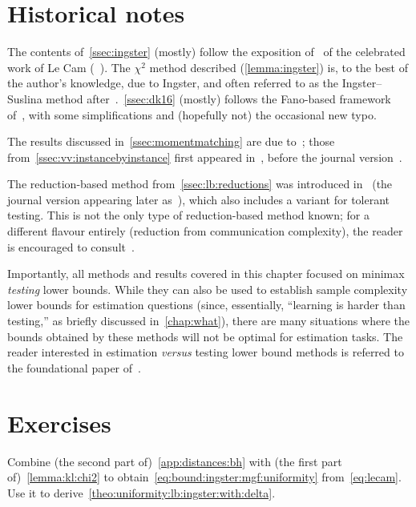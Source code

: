 \section{Historical notes}

The contents of~\cref{ssec:ingster} (mostly) follow the exposition of~\citet{Pollard:2003} of the celebrated work of Le Cam (\eg~\citet{LeCam73}). The $\chi^2$ method described (\cref{lemma:ingster}) is, to the best of the author's knowledge, due to Ingster, and often referred to as the Ingster--Suslina method after~\citep{IngsterS03}.~\cref{ssec:dk16} (mostly) follows the Fano-based framework of~\citet{DiakonikolasK16}, with some simplifications and (hopefully not) the occasional new typo.

The results discussed in~\cref{ssec:momentmatching} are due to~\citet{Valiant:11}; those from~\cref{ssec:vv:instancebyinstance} first appeared in~\citet{VV:14:FOCS}, before the journal version~\citep{ValiantV17}.

The reduction-based method from~\cref{ssec:lb:reductions} was introduced in~\citet{CDGR:16} (the journal version appearing later as~\citep{CDGR:17:journal}), which also includes a variant for tolerant testing. This is not the only type of reduction-based method known; for a different flavour entirely (reduction from communication complexity), the reader is encouraged to consult~\citet{BlaisCG19}.

Importantly, all methods and results covered in this chapter focused on minimax \emph{testing} lower bounds. While they can also be used to establish sample complexity lower bounds for estimation questions (since, essentially, ``learning is harder than testing,'' as briefly discussed in~\cref{chap:what}), there are many situations where the bounds obtained by these methods will not be optimal for estimation tasks. The reader interested in estimation \textit{versus} testing lower bound methods is referred to the foundational paper of~\citet{Yu97}.

\section{Exercises}
\begin{question}\label{exo:deriving:dep:delta:lb}
Combine (the second part of)~\cref{app:distances:bh} with (the first part of)~\cref{lemma:kl:chi2} to obtain~\cref{eq:bound:ingster:mgf:uniformity} from~\cref{eq:lecam}. Use it to derive~\cref{theo:uniformity:lb:ingster:with:delta}.
\end{question}

